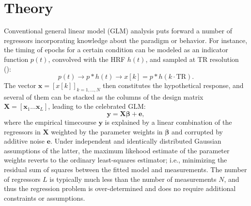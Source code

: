 
\section{Theory}



Conventional general linear model (GLM) analysis puts forward a number of regressors incorporating knowledge about the paradigm or behavior. For instance, the timing of epochs for a certain condition can be modeled as an indicator function $p(t)$, convolved with the HRF $h(t)$, and sampled at TR resolution (\citealt{friston1994analysis, friston1998event, boynton1996linear, cohen1997parametric}):
$$
   p(t) \rightarrow p*h(t) \rightarrow x[k] = p*h(k\cdot\text{TR}).
$$
The vector $\mathbf{x}=[x[k]]_{k=1,\ldots,N}$ then constitutes the hypothetical response, and several of them can be stacked as the columns of the design matrix $\mathbf{X}=[\mathbf{x}_1 \ldots \mathbf{x}_L]$, leading to the celebrated GLM: 
\begin{equation}
    \label{eq:glm}
    \mathbf{y} = \mathbf{X \beta} + \mathbf{e},
\end{equation}
where the empirical timecourse $\mathbf{y}$ is explained by a linear combination of the regressors in $\mathbf{X}$ weighted by the parameter weights in $\mathbf{\beta}$ and corrupted by additive noise $\mathbf{e}$. Under independent and identically distributed Gaussian assumptions of the latter, the maximum likehood estimate of the parameter weights reverts to the ordinary least-squares estimator; i.e., minimizing the residual sum of squares between the fitted model and measurements. The number of regressors $L$ is typically much less than the number of measurements $N$, and thus the regression problem is over-determined and does no require additional constraints or assumptions.

